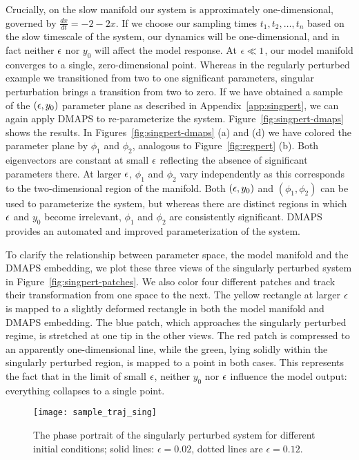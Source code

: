 Crucially, on the slow manifold our system is approximately
one-dimensional, governed by $\frac{dx}{dt} = -2 - 2x$. If we choose
our sampling times $t_1, t_2, \dots, t_n$ based on the slow timescale
of the system, our dynamics will be one-dimensional, and in fact
neither $\epsilon$ nor $y_0$ will affect the model response. At
$\epsilon \ll 1$, our model manifold converges to a single,
zero-dimensional point. Whereas in the regularly perturbed example we
transitioned from two to one significant parameters, singular
perturbation brings a transition from two to zero. If we have obtained
a sample of the $(\epsilon, y_0)$ parameter plane as described in
Appendix~\ref{app:singpert}, we can again apply DMAPS to
re-parameterize the system. Figure~\ref{fig:singpert-dmaps} shows the
results. In Figures~\ref{fig:singpert-dmaps} (a) and (d) we have
colored the parameter plane by $\phi_1$ and $\phi_2$, analogous to
Figure~\ref{fig:regpert} (b). Both eigenvectors are constant at small
$\epsilon$ reflecting the absence of significant parameters there. At
larger $\epsilon$, $\phi_1$ and $\phi_2$ vary independently as this
corresponds to the two-dimensional region of the manifold. Both
$(\epsilon, y_0)$ and $(\phi_1, \phi_2)$ can be used to parameterize the
system, but whereas there are distinct regions in which $\epsilon$ and
$y_0$ become irrelevant, $\phi_1$ and $\phi_2$ are consistently
significant. DMAPS provides an automated and improved parameterization
of the system.

To clarify the relationship between parameter space, the model
manifold and the DMAPS embedding, we plot these three views of the
singularly perturbed system in Figure~\ref{fig:singpert-patches}. We
also color four different patches and track their transformation from
one space to the next. The yellow rectangle at larger $\epsilon$ is mapped
to a slightly deformed rectangle in both the model manifold and DMAPS
embedding. The blue patch, which approaches the singularly perturbed
regime, is stretched at one tip in the other views. The red patch is
compressed to an apparently one-dimensional line, while the green,
lying solidly within the singularly perturbed region, is mapped to a
point in both cases. This represents the fact that in the limit of
small $\epsilon$, neither $y_0$ nor $\epsilon$ influence the model output:
everything collapses to a single point.

\begin{figure}[!htp]
  \centering
  \texttt{[image: sample\_traj\_sing]}
  \caption{The phase portrait of the singularly perturbed system for
    different initial conditions; solid lines: $\epsilon=0.02$, dotted
    lines are $\epsilon=0.12$. \label{fig:singpert}}
\end{figure}

